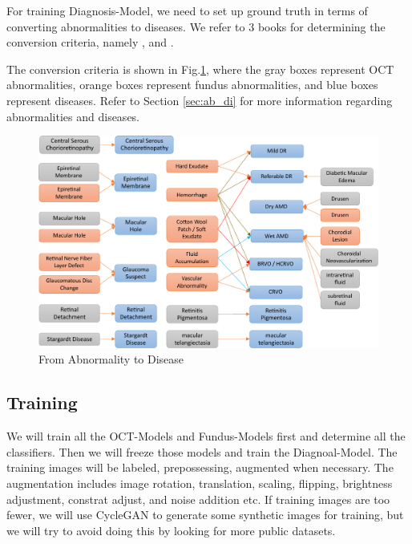 \documentclass{article}
\begin{document}
		For training Diagnosis-Model, we need to set up ground truth in terms of converting abnormalities to diseases.  We refer to 3 books for determining the conversion criteria, namely \textit{}\autocite{Wolf_Kirchhof_Reim_2006}, \textit{}\autocite{Duker_Waheed_Goldman_2022} and \textit{}\autocite{Kawasaki_2013}.  
		
		The conversion criteria is shown in Fig.\ref{fig:abnormality-disease}, where the gray boxes represent OCT abnormalities, orange boxes represent fundus abnormalities, and blue boxes represent diseases.  Refer to Section \ref{sec:ab_di} for more information regarding abnormalities and diseases.
		
		\vspace{0.3cm}
		
		\begin{figure}[htbp]
			\centering
			\includegraphics[width=0.95\linewidth]{Abnormality-Disease.pdf}
			\vspace{0.3cm}
			\caption{From Abnormality to Disease}
			\label{fig:abnormality-disease}
		\end{figure}
	
	\subsection{Training}

		We will train all the OCT-Models and Fundus-Models first and determine all the classifiers.  Then we will freeze those models and train the Diagnoal-Model.  The training images will be labeled, prepossessing, augmented when necessary.  The augmentation includes image rotation, translation, scaling, flipping, brightness adjustment, constrat adjust, and noise addition etc.  If training images are too fewer, we will use CycleGAN to generate some synthetic images for training, but we will try to avoid doing this by looking for more public datasets.
		
\end{document}
